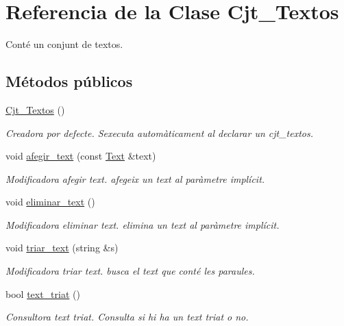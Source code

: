 \hypertarget{class_cjt___textos}{}\section{Referencia de la Clase Cjt\+\_\+\+Textos}
\label{class_cjt___textos}


Conté un conjunt de textos.  


\subsection*{Métodos públicos}
\begin{DoxyCompactItemize}
\item 
\hyperlink{class_cjt___textos_a294e9acbffc974a871f9417579390ad4}{Cjt\+\_\+\+Textos} ()
\begin{DoxyCompactList}\small\item\em Creadora por defecte. S\textquotesingle{}executa automàticament al declarar un cjt\+\_\+textos. \end{DoxyCompactList}\item 
void \hyperlink{class_cjt___textos_a1f8b5c6cf35bc96e409855ac93002a62}{afegir\+\_\+text} (const \hyperlink{class_text}{Text} \&text)
\begin{DoxyCompactList}\small\item\em Modificadora afegir text. afegeix un text al paràmetre implícit. \end{DoxyCompactList}\item 
void \hyperlink{class_cjt___textos_a69c7fdefd849715024904dda5fa32118}{eliminar\+\_\+text} ()
\begin{DoxyCompactList}\small\item\em Modificadora eliminar text. elimina un text al paràmetre implícit. \end{DoxyCompactList}\item 
void \hyperlink{class_cjt___textos_aa2e5ac744d6306047c6cdda58aad5c19}{triar\+\_\+text} (string \&s)
\begin{DoxyCompactList}\small\item\em Modificadora triar text. busca el text que conté les paraules. \end{DoxyCompactList}\item 
bool \hyperlink{class_cjt___textos_abd1ec8b9d6bfdeea602dea3398dd0599}{text\+\_\+triat} ()
\begin{DoxyCompactList}\small\item\em Consultora text triat. Consulta si hi ha un text triat o no. \end{DoxyCompactList}\item 

\end{DoxyCompactItemize}
